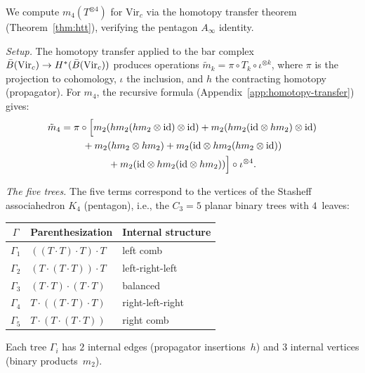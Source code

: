 \begin{computation}
\label{comp:virasoro-m4}
We compute $m_4(T^{\otimes 4})$ for $\mathrm{Vir}_c$ via
the homotopy transfer theorem (Theorem~\ref{thm:htt}),
verifying the pentagon $A_\infty$ identity.

\emph{Setup.}
The homotopy transfer applied to the bar complex
$\bar{B}(\mathrm{Vir}_c) \to H^*(\bar{B}(\mathrm{Vir}_c))$
produces operations $\tilde{m}_k = \pi \circ T_k \circ \iota^{\otimes k}$,
where $\pi$ is the projection to cohomology, $\iota$ the inclusion,
and $h$ the contracting homotopy (propagator).
For $m_4$, the recursive formula
(Appendix~\ref{app:homotopy-transfer}) gives:
\begin{multline}\label{eq:m4-transfer}
\tilde{m}_4 = \pi \circ \Bigl[
m_2(hm_2(hm_2 \otimes \mathrm{id})\otimes \mathrm{id}) +
m_2(hm_2(\mathrm{id} \otimes hm_2)\otimes \mathrm{id}) \\
{} + m_2(hm_2 \otimes hm_2) +
m_2(\mathrm{id} \otimes hm_2(hm_2 \otimes \mathrm{id})) \\
{} + m_2(\mathrm{id} \otimes hm_2(\mathrm{id} \otimes hm_2))
\Bigr] \circ \iota^{\otimes 4}.
\end{multline}

\emph{The five trees.}
The five terms correspond to the vertices of the Stasheff
associahedron $K_4$ (pentagon), i.e., the $C_3 = 5$ planar binary
trees with $4$~leaves:
\begin{center}
\renewcommand{\arraystretch}{1.3}
\begin{tabular}{cll}
\toprule
$\Gamma$ & Parenthesization & Internal structure \\
\midrule
$\Gamma_1$ & $((T \cdot T) \cdot T) \cdot T$ & left comb \\
$\Gamma_2$ & $(T \cdot (T \cdot T)) \cdot T$ & left-right-left \\
$\Gamma_3$ & $(T \cdot T) \cdot (T \cdot T)$ & balanced \\
$\Gamma_4$ & $T \cdot ((T \cdot T) \cdot T)$ & right-left-right \\
$\Gamma_5$ & $T \cdot (T \cdot (T \cdot T))$ & right comb \\
\bottomrule
\end{tabular}
\end{center}
Each tree $\Gamma_i$ has $2$ internal edges (propagator insertions~$h$)
and $3$ internal vertices (binary products~$m_2$).


\end{computation}
